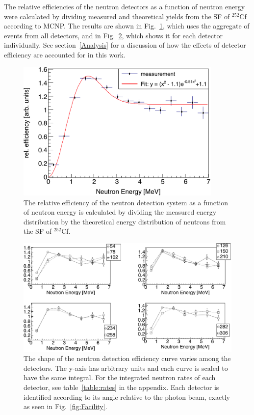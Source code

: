 The relative efficiencies of the neutron detectors as a function of neutron energy were calculated by dividing measured and theoretical yields from the SF of $^{252}$Cf according to MCNP.
The results are shown in Fig.~\ref{fig:RelErgEfficiency}, which uses the aggregate of events from all detectors, and in Fig.~\ref{fig:RelErgEfficiencyVariation}, which shows it for each detector individually.
See section~\ref{Analysis} for a discussion of how the effects of detector efficiency are accounted for in this work.
\begin{figure}[]
    \centering
    \includegraphics[width = 0.9\textwidth]{Content/Methods/RelErgEfficiency.png}
    \caption{The relative efficiency of the neutron detection system as a function of neutron energy is calculated by dividing the measured energy distribution by the theoretical energy distribution of neutrons from the SF of $^{252}$Cf.}
    \label{fig:RelErgEfficiency}
\end{figure}
\begin{figure}[]
    \centering
    \includegraphics[width = 1\textwidth]{Content/Methods/RelErgEfficiencyVariation.png}
    \caption{
    The shape of the neutron detection efficiency curve varies among the detectors.
    The y-axis has arbitrary units and each curve is scaled to have the same integral.
    For the integrated neutron rates of each detector, see table~\ref{table:rates} in the appendix.
    Each detector is identified according to its angle relative to the photon beam, exactly as seen in Fig.~\ref{fig:Facility}.
    }
    \label{fig:RelErgEfficiencyVariation}
\end{figure}

